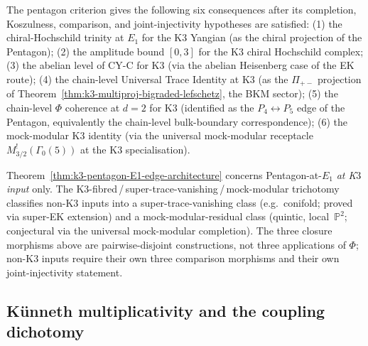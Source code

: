 \begin{remark}
\label{rem:k3-pentagon-six-corollaries}
The pentagon criterion gives the following six consequences after its
completion, Koszulness, comparison, and joint-injectivity hypotheses
are satisfied:
\textup{(1)} the chiral-Hochschild trinity at $E_1$ for the K$3$
Yangian \textup{(}as the chiral projection of the Pentagon\textup{);}
\textup{(2)} the amplitude bound $[0, 3]$ for the K$3$ chiral
Hochschild complex;
\textup{(3)} the abelian level of CY-C for K$3$
\textup{(}via the abelian Heisenberg case of the EK route\textup{);}
\textup{(4)} the chain-level Universal Trace Identity at K$3$
\textup{(}as the $\Pi_{+-}$ projection of
Theorem~\ref{thm:k3-multiproj-bigraded-lefschetz}, the BKM
sector\textup{);}
\textup{(5)} the chain-level $\Phi$ coherence at $d = 2$ for K$3$
\textup{(}identified as the $P_4 \leftrightarrow P_5$ edge of the
Pentagon, equivalently the chain-level bulk-boundary correspondence\textup{);}
\textup{(6)} the mock-modular K$3$ identity
\textup{(}via the universal mock-modular receptacle
$M^!_{3/2}(\Gamma_0(5))$ at the K$3$ specialisation\textup{).}
\end{remark}

\begin{remark}
\label{rem:k3-pentagon-non-K3-open}
Theorem~\ref{thm:k3-pentagon-E1-edge-architecture} concerns
Pentagon-at-$E_1$ \emph{at K$3$ input} only. The
K$3$-fibred\,/\,super-trace-vanishing\,/\,mock-modular trichotomy
classifies non-K$3$ inputs into a super-trace-vanishing class
\textup{(}e.g.\ conifold; proved via super-EK extension\textup{)}
and a mock-modular-residual class \textup{(}quintic,
local~$\mathbb{P}^2$; conjectural via the universal mock-modular
completion\textup{).} The three closure morphisms above are
pairwise-disjoint constructions, not three applications of $\Phi$;
non-K$3$ inputs require their own three comparison morphisms and their
own joint-injectivity statement.
\end{remark}

\subsection{Künneth multiplicativity and the coupling dichotomy}
\label{subsec:kunneth-multiplicativity}

